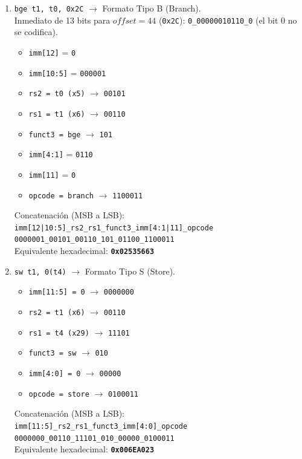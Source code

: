 \documentclass[letterpaper,12pt]{article}
\begin{document}
\begin{enumerate}
\begin{enumerate}[label=\alph*)]
        \item \texttt{bge t1, t0, 0x2C} $\rightarrow$ Formato Tipo B (Branch). \\
        Inmediato de 13 bits para $offset = 44$ (\texttt{0x2C}): \texttt{0\_00000010110\_0} (el bit 0 no se codifica).
        \begin{itemize}[noitemsep]
            \item \texttt{imm[12]} = \texttt{0}
            \item \texttt{imm[10:5]} = \texttt{000001}
            \item \texttt{rs2 = t0 (x5)} $\rightarrow$ \texttt{00101}
            \item \texttt{rs1 = t1 (x6)} $\rightarrow$ \texttt{00110}
            \item \texttt{funct3 = bge} $\rightarrow$ \texttt{101}
            \item \texttt{imm[4:1]} = \texttt{0110}
            \item \texttt{imm[11]} = \texttt{0}
            \item \texttt{opcode = branch} $\rightarrow$ \texttt{1100011}
        \end{itemize}
        Concatenación (MSB a LSB): \\
        \texttt{imm[12|10:5]\_rs2\_rs1\_funct3\_imm[4:1|11]\_opcode} \\
        \texttt{0000001\_00101\_00110\_101\_01100\_1100011} \\
        Equivalente hexadecimal: \textbf{\texttt{0x02535663}}
        
        \item \texttt{sw t1, 0(t4)} $\rightarrow$ Formato Tipo S (Store).
        \begin{itemize}[noitemsep]
            \item \texttt{imm[11:5] = 0} $\rightarrow$ \texttt{0000000}
            \item \texttt{rs2 = t1 (x6)} $\rightarrow$ \texttt{00110}
            \item \texttt{rs1 = t4 (x29)} $\rightarrow$ \texttt{11101}
            \item \texttt{funct3 = sw} $\rightarrow$ \texttt{010}
            \item \texttt{imm[4:0] = 0} $\rightarrow$ \texttt{00000}
            \item \texttt{opcode = store} $\rightarrow$ \texttt{0100011}
        \end{itemize}
        Concatenación (MSB a LSB): \\
        \texttt{imm[11:5]\_rs2\_rs1\_funct3\_imm[4:0]\_opcode} \\
        \texttt{0000000\_00110\_11101\_010\_00000\_0100011} \\
        Equivalente hexadecimal: \textbf{\texttt{0x006EA023}}
    \end{enumerate}
    \color{black}


\end{enumerate}
\end{document}
